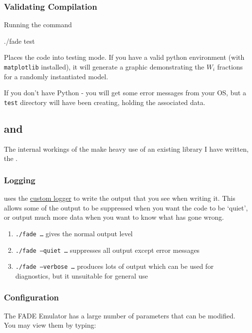 	\subsubsection{Validating Compilation}

		Running the command
		\begin{terminal}
			./fade test
		\end{terminal}

		Places the code into testing mode. If you have a valid python environment (with \texttt{matplotlib} installed), it will generate a graphic demonstrating the $W_i$ fractions for a randomly instantiated model.

		If you don't have Python - you will get some error messages from your OS, but a \texttt{test} directory will have been creating, holding the associated data.
\subsection{\fade{} and \jsl{}}

	The internal workings of the \fade{} make heavy use of an existing library I have written, the \jsl{}.

	\subsubsection{Logging}
		\fade{} uses the \href{https://jack-standard-library.readthedocs.io/en/stable/docfiles/Log.html#log}{custom \jsl{} logger} to write the output that you see when writing it. This allows some of the output to be suppressed when you want the code to be `quiet', or output much more data when you want to know what has gone wrong.

		\begin{enumerate}
			\item \texttt{./fade \ldots} gives the normal output level
			\item \texttt{./fade --quiet \ldots} suppresses all output except error messages
			\item \texttt{./fade --verbose \ldots} produces lots of output which can be used for diagnostics, but it unsuitable for general use
		\end{enumerate}

	\subsubsection{Configuration}

		The FADE Emulator has a large number of parameters that can be modified. You may view them by typing:

